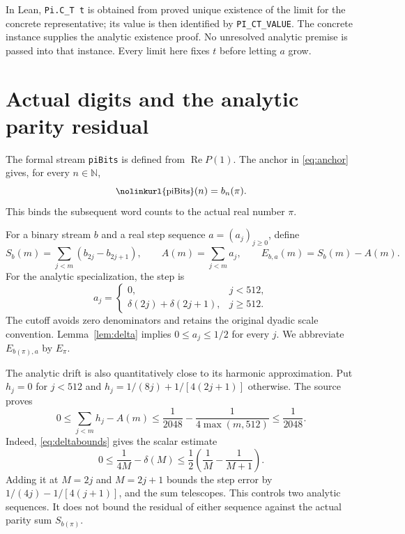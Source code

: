 \documentclass[11pt,a4paper]{article}
\theoremstyle{definition}
\theoremstyle{remark}
\newcommand{\N}{\mathbb N}
\newcommand{\code}[1]{{\small\nolinkurl{#1}}}
\begin{document}
In Lean, \code{Pi.C_T t} is obtained from proved unique existence of
the limit for the concrete representative; its value is then identified
by \code{PI_CT_VALUE}. The concrete instance supplies the analytic
existence proof. No unresolved analytic premise is passed into that
instance. Every limit here fixes $t$ before letting $a$ grow.

\section{Actual digits and the analytic parity residual}
\label{sec:residual}

The formal stream \code{piBits} is defined from
$\operatorname{Re}P(1)$. The anchor in \eqref{eq:anchor} gives, for every
$n\in\N$,
\[
 \text{\code{piBits}}(n)=b_n(\pi).
\]
This binds the subsequent word counts to the actual real number $\pi$.

For a binary stream $b$ and a real step sequence $a=(a_j)_{j\ge0}$,
define
\begin{equation}
 S_b(m)=\sum_{j<m}(b_{2j}-b_{2j+1}),\qquad
 A(m)=\sum_{j<m}a_j,\qquad E_{b,a}(m)=S_b(m)-A(m).
 \label{eq:residual}
\end{equation}
For the analytic specialization, the step is
\begin{equation}
 a_j=
 \begin{cases}
 0,&j<512,\\
 \delta(2j)+\delta(2j+1),&j\ge512.
 \end{cases}
 \label{eq:analyticstep}
\end{equation}
The cutoff avoids zero denominators and retains the original dyadic
scale convention. Lemma~\ref{lem:delta} implies
$0\le a_j\le1/2$ for every $j$.
We abbreviate $E_{b(\pi),a}$ by $E_\pi$.

The analytic drift is also quantitatively close to its harmonic
approximation. Put $h_j=0$ for $j<512$ and
$h_j=1/(8j)+1/[4(2j+1)]$ otherwise.
The source proves
\begin{equation}
 0\le\sum_{j<m}h_j-A(m)
 \le \frac1{2048}-\frac1{4\max(m,512)}
 \le\frac1{2048}.
 \label{eq:harmonic}
\end{equation}
Indeed, \eqref{eq:deltabounds} gives the scalar estimate
\[
 0\le\frac1{4M}-\delta(M)
 \le\frac12\left(\frac1M-\frac1{M+1}\right).
\]
Adding it at $M=2j$ and $M=2j+1$ bounds the step error by
$1/(4j)-1/[4(j+1)]$, and the sum telescopes.
This controls two analytic sequences. It does not bound the residual
of either sequence against the actual parity sum $S_{b(\pi)}$.
\end{document}
